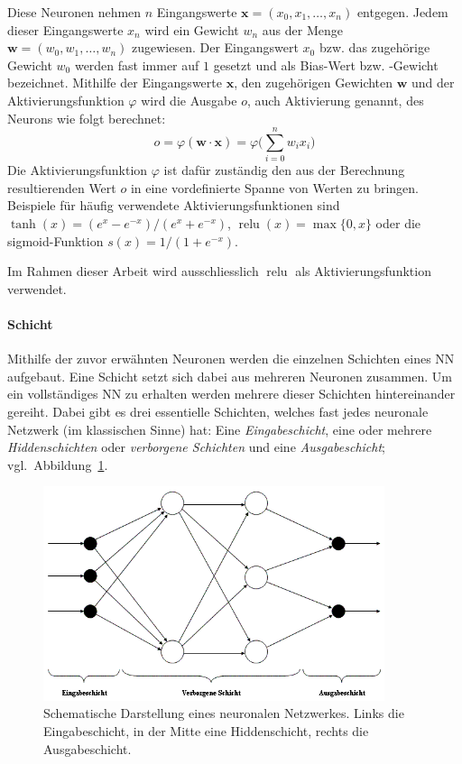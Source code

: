 Diese Neuronen nehmen $n$ Eingangswerte $\mathbf{x} = (x_0, x_1, \dots, x_n)$ entgegen. Jedem dieser Eingangswerte $x_n$ wird ein Gewicht $w_n$ aus der Menge $\mathbf{w} = (w_0, w_1, \dots, w_n)$ zugewiesen. Der Eingangswert $x_0$ bzw. das zugehörige Gewicht $w_0$ werden fast immer auf $1$ gesetzt und als Bias-Wert bzw. -Gewicht bezeichnet. Mithilfe der Eingangswerte $\mathbf{x}$, den zugehörigen Gewichten $\mathbf{w}$ und der Aktivierungsfunktion $\varphi$ wird die Ausgabe $o$, auch Aktivierung genannt, des Neurons wie folgt berechnet:
\begin{equation}
o = \varphi(\mathbf{w} \cdot \mathbf{x}) = \varphi\bigg(\sum_{i=0}^{n} w_i x_i\bigg)
\label{basics:neural_network:compute_equation}
\end{equation}
Die Aktivierungsfunktion $\varphi$ ist dafür zuständig den aus der Berechnung resultierenden Wert $o$ in eine vordefinierte Spanne von Werten zu bringen. Beispiele für häufig verwendete Aktivierungsfunktionen sind $\tanh(x) = (e^x - e^{-x})/(e^x + e^{-x})$, $\operatorname{relu}(x) = \max\{0,x\}$ oder die sigmoid-Funktion $s(x) = 1/(1 + e^{-x})$.

Im Rahmen dieser Arbeit wird ausschliesslich $\operatorname{relu}$ als Aktivierungsfunktion verwendet.

\paragraph{Schicht}\label{basic:neural_network:layer} Mithilfe der zuvor erwähnten Neuronen werden die einzelnen Schichten eines NN aufgebaut. Eine Schicht setzt sich dabei aus mehreren Neuronen zusammen. Um ein vollständiges NN zu erhalten werden mehrere dieser Schichten hintereinander gereiht. Dabei gibt es drei essentielle Schichten, welches fast jedes neuronale Netzwerk (im klassischen Sinne) hat: Eine \emph{Eingabeschicht}, eine oder mehrere \emph{Hiddenschichten} oder \emph{verborgene Schichten} und eine \emph{Ausgabeschicht}; vgl.\ Abbildung~\ref{fig:schichten}.

\begin{figure}[h]
  \centering
  \includegraphics[width=10cm]{img/basic_neural_network}
  \caption{Schematische Darstellung eines neuronalen Netzwerkes. Links die Eingabeschicht, in der Mitte eine Hiddenschicht, rechts die Ausgabeschicht.}
  \label{fig:schichten}
\end{figure}

